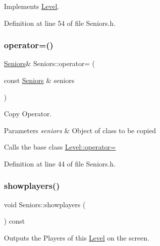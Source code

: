 Implements \hyperlink{class_level_a161cf8c238fd499c112d90504cb6f587}{Level}.



Definition at line 54 of file Seniors.\+h.

\hypertarget{class_seniors_a6ec55b45cb67c34004c38a36fc3f8e64}{}\label{class_seniors_a6ec55b45cb67c34004c38a36fc3f8e64} 
\subsubsection{\texorpdfstring{operator=()}{operator=()}}
{\footnotesize\ttfamily \hyperlink{class_seniors}{Seniors}\& Seniors\+::operator= (\begin{DoxyParamCaption}\item[{const \hyperlink{class_seniors}{Seniors} \&}]{seniors }\end{DoxyParamCaption})\hspace{0.3cm}{\ttfamily [inline]}}



Copy Operator. 


\begin{DoxyParams}{Parameters}
{\em seniors} & Object of class to be copied\\
\hline
\end{DoxyParams}
Calls the base class \hyperlink{class_level_a60eb04b65c900ae8dddf3d6251fac7b1}{Level\+::operator=} 

Definition at line 44 of file Seniors.\+h.

\hypertarget{class_seniors_a671c22ddbb0c2df27adf12364db0380a}{}\label{class_seniors_a671c22ddbb0c2df27adf12364db0380a} 
\subsubsection{\texorpdfstring{showplayers()}{showplayers()}}
{\footnotesize\ttfamily void Seniors\+::showplayers (\begin{DoxyParamCaption}{ }\end{DoxyParamCaption}) const\hspace{0.3cm}{\ttfamily [virtual]}}



Outputs the Players of this \hyperlink{class_level}{Level} on the screen. 




